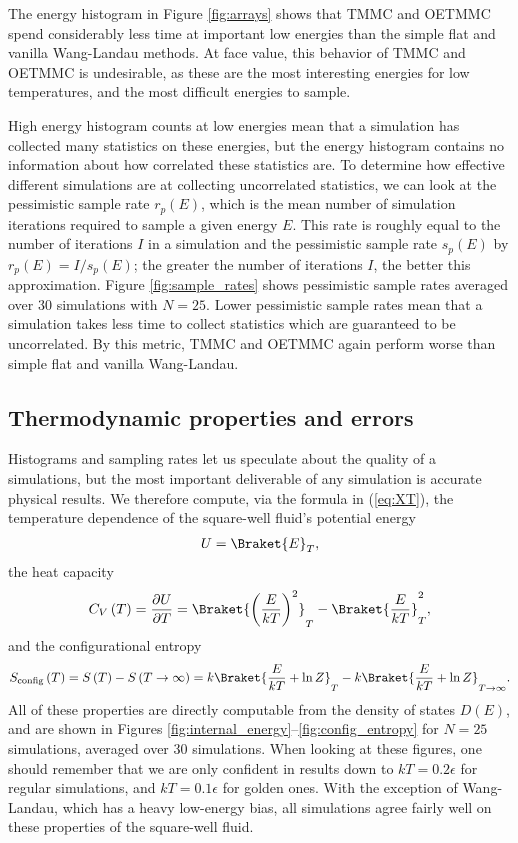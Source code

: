\documentclass[11pt]{article}
\newcommand{\bk}{\Braket} %
\renewcommand{\t}{\text} %
\newcommand{\f}[2]{\dfrac{#1}{#2}} %
\newcommand{\p}[1]{\left(#1\right)} %
\begin{document}
The energy histogram in Figure \ref{fig:arrays} shows that TMMC and
OETMMC spend considerably less time at important low energies than the
simple flat and vanilla Wang-Landau methods. At face value, this
behavior of TMMC and OETMMC is undesirable, as these are the most
interesting energies for low temperatures, and the most difficult
energies to sample.

High energy histogram counts at low energies mean that a simulation
has collected many statistics on these energies, but the energy
histogram contains no information about how correlated these
statistics are. To determine how effective different simulations are
at collecting uncorrelated statistics, we can look at the pessimistic
sample rate $r_p\p{E}$, which is the mean number of simulation
iterations required to sample a given energy $E$. This rate is roughly
equal to the number of iterations $I$ in a simulation and the
pessimistic sample rate $s_p\p{E}$ by $r_p\p{E}=I/s_p\p{E}$; the
greater the number of iterations $I$, the better this
approximation. Figure \ref{fig:sample_rates} shows pessimistic sample
rates averaged over 30 simulations with $N=25$. Lower pessimistic
sample rates mean that a simulation takes less time to collect
statistics which are guaranteed to be uncorrelated. By this metric,
TMMC and OETMMC again perform worse than simple flat and vanilla
Wang-Landau.

\subsection{Thermodynamic properties and errors}
\label{sec:properties}

Histograms and sampling rates let us speculate about the quality of a
simulations, but the most important deliverable of any simulation is
accurate physical results. We therefore compute, via the formula in
(\ref{eq:XT}), the temperature dependence of the square-well fluid's
potential energy
\begin{align}
  U=\bk{E}_T,
  \label{eq:U}
\end{align}
the heat capacity
\begin{align}
  C_V\p{T}=\f{\partial U}{\partial T}
  =\bk{\p{\f{E}{kT}}^2}_T-\bk{\f{E}{kT}}_T^2,
  \label{eq:CV}
\end{align}
and the configurational entropy
\begin{align}
  S_{\t{config}}\p{T}=S\p{T}-S\p{T\to\infty} =k\bk{\f{E}{kT}+\ln
    Z}_T-k\bk{\f{E}{kT}+\ln Z}_{T\to\infty}.
  \label{eq:S}
\end{align}
All of these properties are directly computable from the density of
states $D\p{E}$, and are shown in Figures
\ref{fig:internal_energy}--\ref{fig:config_entropy} for $N=25$
simulations, averaged over 30 simulations. When looking at these
figures, one should remember that we are only confident in results
down to $kT=0.2\epsilon$ for regular simulations, and $kT=0.1\epsilon$
for golden ones. With the exception of Wang-Landau, which has a heavy
low-energy bias, all simulations agree fairly well on these properties
of the square-well fluid.
\end{document}
